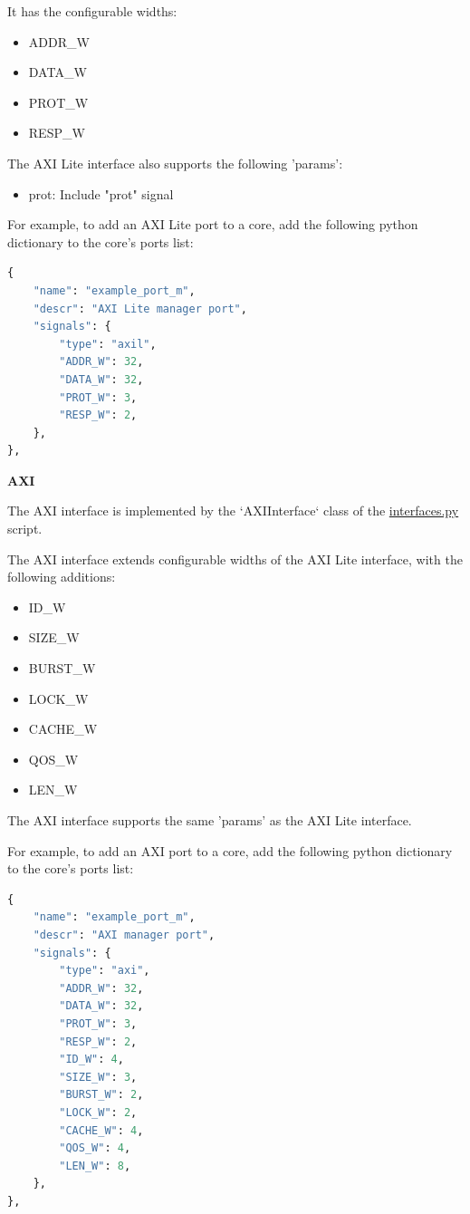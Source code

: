 
It has the configurable widths: 
\begin{itemize}
  \item ADDR\_W
  \item DATA\_W
  \item PROT\_W
  \item RESP\_W
\end{itemize}

The AXI Lite interface also supports the following 'params':
\begin{itemize}
  \item prot: Include "prot" signal
\end{itemize}

For example, to add an AXI Lite port to a core, add the following python dictionary to the core's ports list:
\begin{lstlisting}[language=python]
{
	"name": "example_port_m",
	"descr": "AXI Lite manager port",
	"signals": {
		"type": "axil",
		"ADDR_W": 32,
		"DATA_W": 32,
		"PROT_W": 3,
		"RESP_W": 2,
	},
},
\end{lstlisting}


%
%
\clearpage
\large\textbf{AXI}

The AXI interface is implemented by the `AXIInterface` class of the \href{https://github.com/IObundle/py2hwsw/blob/main/py2hwsw/scripts/interfaces.py}{interfaces.py} script.


The AXI interface extends configurable widths of the AXI Lite interface, with the following additions:
\begin{itemize}
  \item ID\_W
  \item SIZE\_W
  \item BURST\_W
  \item LOCK\_W
  \item CACHE\_W
  \item QOS\_W
  \item LEN\_W
\end{itemize}

The AXI interface supports the same 'params' as the AXI Lite interface.

For example, to add an AXI port to a core, add the following python dictionary to the core's ports list:
\begin{lstlisting}[language=python]
{
	"name": "example_port_m",
	"descr": "AXI manager port",
	"signals": {
		"type": "axi",
		"ADDR_W": 32,
		"DATA_W": 32,
		"PROT_W": 3,
		"RESP_W": 2,
		"ID_W": 4,
		"SIZE_W": 3,
		"BURST_W": 2,
		"LOCK_W": 2,
		"CACHE_W": 4,
		"QOS_W": 4,
		"LEN_W": 8,
	},
},
\end{lstlisting}


